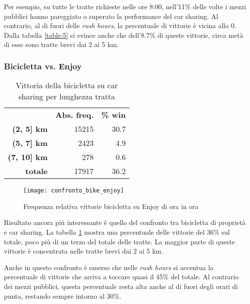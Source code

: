 Per esempio, su tutte le tratte richieste nelle ore 8:00, nell'11\% delle volte i mezzi pubblici hanno pareggiato o superato la performance del car sharing. Al contrario, al di fuori delle \textit{rush hours}, la percentuale di vittorie è vicina allo 0. Dalla tabella \ref{table:5} si evince anche che dell'8.7\% di queste vittorie, circa metà di esse sono tratte brevi dai 2 ai 5 km.

\subsubsection{Bicicletta vs. Enjoy}

\begin{table}[H]
	\centering
	
	\begin{tabular}{ | r r r | }
		\hline
		& \textbf{Abs. freq.} & \textbf{\% win} \\
		\textbf{(2, 5] km} & 15215 & 30.7 \\
		\textbf{(5, 7] km} & 2423 & 4.9 \\
		\textbf{(7, 10] km} & 278 & 0.6 \\
		\hline
		\textbf{totale} & 17917 & 36.2 \\
		\hline
	\end{tabular}
	
	\caption{Vittoria della bicicletta su car sharing per lunghezza tratta}
	\label{table:6}
\end{table}

\begin{figure}[H]
	\texttt{[image: confronto\_bike\_enjoy]}
	\caption{Frequenza relativa vittorie bicicletta su Enjoy di ora in ora}
	\label{image:11}
\end{figure}

Risultato ancora più interessante è quello del confronto tra bicicletta di proprietà e car sharing. La tabella \ref{table:6} mostra una percentuale delle vittorie del 36\% sul totale, poco più di un terzo del totale delle tratte. La maggior parte di queste vittorie è concentrata nelle tratte brevi dai 2 ai 5 km.

Anche in questo confronto è emerso che nelle \textit{rush hours} si accentua la percentuale di vittorie che arriva a toccare quasi il 45\% del totale. Al contrario dei mezzi pubblici, questa percentuale resta alta anche al di fuori degli orari di punta, restando sempre intorno al 30\%.


